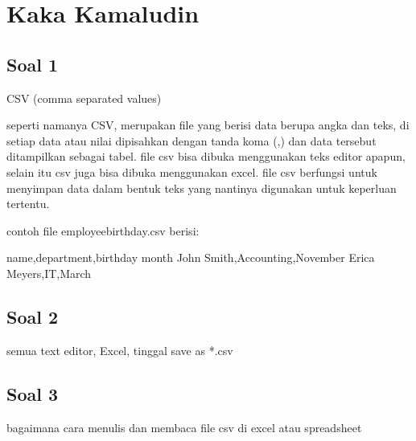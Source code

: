 \section{Kaka Kamaludin}
\subsection{Soal 1}
CSV (comma separated values)

seperti namanya CSV, merupakan file yang berisi data berupa angka dan teks, di setiap data atau nilai dipisahkan dengan tanda koma (,) dan data tersebut ditampilkan sebagai tabel. file csv bisa dibuka menggunakan teks editor apapun, selain itu csv juga bisa dibuka menggunakan excel. file csv berfungsi untuk menyimpan data dalam bentuk teks yang nantinya digunakan untuk keperluan tertentu.

contoh file employee\textunderscore birthday.csv berisi:

name,department,birthday month
John Smith,Accounting,November
Erica Meyers,IT,March

\subsection{Soal 2}
semua text editor, Excel, tinggal save as *.csv

\subsection{Soal 3}
bagaimana cara menulis dan membaca file csv di excel atau spreadsheet


